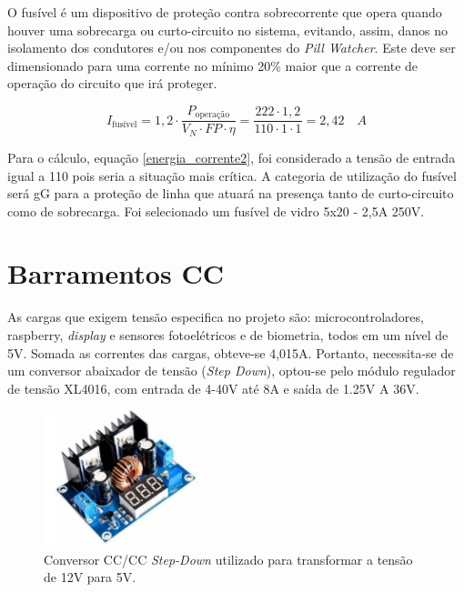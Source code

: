 O fusível é um dispositivo de proteção contra sobrecorrente que opera quando houver uma sobrecarga ou curto-circuito no sistema, evitando, assim, danos no isolamento dos condutores e/ou nos componentes do \textit{Pill Watcher}. Este deve ser dimensionado para uma corrente no mínimo 20\% maior que a corrente de operação do circuito que irá proteger.

    \begin{equation}
        I_{\text{fusível}} = 1,2 \cdot \frac{P_{\text{operação}}}{V_{N} \cdot FP \cdot \eta} = \frac{222 \cdot 1,2}{110 \cdot 1 \cdot 1} = 2,42 \quad A
        \label{energia_corrente2}
    \end{equation}
    
Para o cálculo, equação \ref{energia_corrente2}, foi considerado a tensão de entrada igual a 110 pois seria a situação mais crítica. A categoria de utilização do fusível será gG para a proteção de linha que atuará na presença tanto de curto-circuito como de sobrecarga. Foi selecionado um fusível de vidro 5x20 - 2,5A 250V. 

\section{Barramentos CC}

As cargas que exigem tensão especifica no projeto são: microcontroladores, raspberry, \textit{display} e sensores fotoelétricos e de biometria, todos em um nível de 5V. Somada as correntes das cargas, obteve-se 4,015A. Portanto, necessita-se de um conversor abaixador de tensão (\textit{Step Down}), optou-se pelo módulo regulador de tensão XL4016, com entrada de 4-40V até 8A e saída de 1.25V A 36V. 

\begin{figure}[H]
\centering
    \includegraphics[width=0.4\textwidth]{figuras/barramento_5V.PNG}
    \caption{Conversor CC/CC \textit{Step-Down} utilizado para transformar a tensão de 12V para 5V.}
\end{figure}
